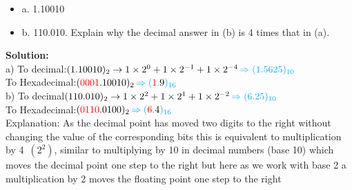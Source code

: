 \documentclass[a4paper,12pt]{extarticle}
\begin{document}
\begin{itemize}
\item a. 1.10010
\item b. 110.010. Explain why the decimal answer in (b) is 4 times that in (a).
\end{itemize}
{\color{blue}\textbf{Solution:}}\\[0.3cm]
\indent \color{red} a) \color{black} To decimal:$(1.10010)_2 \rightarrow 1 \times 2^0 + 1 \times 2^{-1} +1 \times 2^{-4} \, { \color{cyan} \Rightarrow (1.5625)_{10}}$\\
\indent To Hexadecimal:$({\color{red}0001}.{\color{black}1001}0)_2  \, { \color{cyan} \Rightarrow ({\color{red}1}.{\color{black}9})_{16}}$\\[0.2cm]
\indent \color{red} b) \color{black} To decimal$(110.010)_2 \rightarrow 1 \times 2^2 + 1 \times 2^{1} +1 \times 2^{-2} \, { \color{cyan} \Rightarrow (6.25)_{10}}$\\
\indent To Hexadecimal:$({\color{red}0110}.{\color{black}0100})_2  \, { \color{cyan} \Rightarrow ({\color{red}6}.{\color{black}4})_{16}}$\\[0.1cm]
Explanation: As the decimal point has moved two digits to the right without changing the value of the corresponding bits this is equivalent to multiplication by 4 $ \, (2^2)$, similar to multiplying by 10 in decimal numbers (base 10) which moves the decimal point one step to the right but here as we work with base 2 a multiplication by 2 moves the floating point one step to the right  
\newpage
\end{document}
